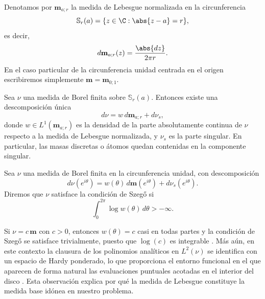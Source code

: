 \begin{defn}
	Denotamos por $\mathbf{m}_{a;r}$ la medida de Lebesgue normalizada en la circunferencia
	$$\mathbb{S}_r(a) = \{z \in \C : \abs{z-a} = r\},$$
	es decir,
	\begin{equation}
		d\mathbf{m}_{a;r}(z) = \frac{\abs{dz}}{2\pi r}.
	\end{equation}
	En el caso particular de la circunferencia unidad centrada en el origen escribiremos simplemente $\mathbf{m} = \mathbf{m}_{0;1}$.
\end{defn}

\begin{defn}
	Sea $\nu$ una medida de Borel finita sobre $\mathbb{S}_r(a)$. Entonces existe una descomposición única
	\begin{equation}
		d\nu = w\, d\mathbf{m}_{a;r} + d\nu_s,
	\end{equation}
	donde $w \in L^1(\mathbf{m}_{a;r})$ es la densidad de la parte absolutamente continua de $\nu$ respecto a la medida de Lebesgue normalizada, y $\nu_s$ es la parte singular. En particular, las masas discretas o átomos quedan contenidas en la componente singular.
\end{defn}

\begin{defn}
	Sea $\nu$ una medida de Borel finita en la circunferencia unidad, con descomposición
	\begin{equation}
		d\nu(e^{i\theta}) = w(\theta)\, d\mathbf{m}(e^{i\theta}) + d\nu_s(e^{i\theta}).
	\end{equation}
	Diremos que $\nu$ satisface la condición de Szegő si
	\begin{equation}
		\int_0^{2\pi} \log w(\theta)\, d\theta > -\infty.
	\end{equation}
\end{defn}

\begin{rmk}
	Si $\nu = c\,\mathbf{m}$ con $c>0$, entonces $w(\theta)=c$ casi en todas partes y la condición de Szegő se satisface trivialmente, puesto que $\log(c)$ es integrable \cite{szego1975orthogonal}. Más aún, en este contexto la clausura de los polinomios analíticos en $L^2(\nu)$ se identifica con un espacio de Hardy ponderado, lo que proporciona el entorno funcional en el que aparecen de forma natural las evaluaciones puntuales acotadas en el interior del disco \cite{duren1970theory}. Esta observación explica por qué la medida de Lebesgue constituye la medida base idónea en nuestro problema.
\end{rmk}

